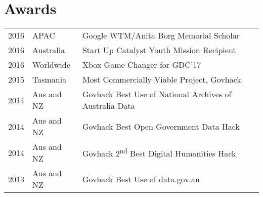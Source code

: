 \documentclass[a4paper]{deedy-resume} %
\begin{document}
\begin{minipage}[t]{0.66\textwidth}
\section{Awards}

\begin{tabular}{rll}
2016	 & APAC & Google WTM/Anita Borg Memorial Scholar\\
2016	 & Australia & Start Up Catalyst Youth Mission Recipient \\
2016	 & Worldwide & Xbox Game Changer for GDC'17\\
2015	 & Tasmania & Most Commercially Viable Project, Govhack\\
2014	 & Aus and NZ & Govhack Best Use of National Archives of Australia Data \\
2014	 & Aus and NZ & Govhack Best Open Government Data Hack \\
2014	 & Aus and NZ & Govhack 2\textsuperscript{nd} Best Digital Humanities Hack \\
2013	 & Aus and NZ & Govhack Best Use of data.gov.au \\
\end{tabular}

\sectionspace %






\end{minipage} %
\end{document}
